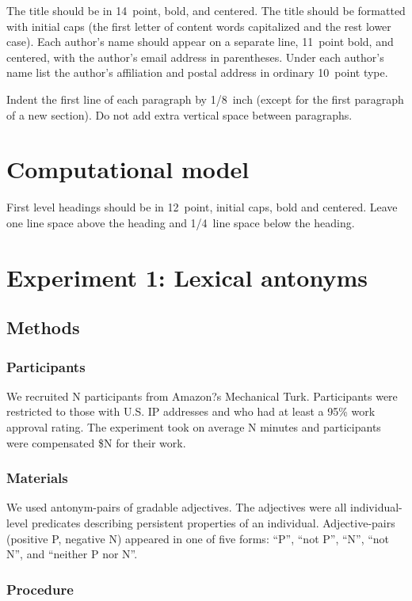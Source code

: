 \documentclass[10pt,letterpaper]{article}
\begin{document}
The title should be in 14~point, bold, and centered. The title should
be formatted with initial caps (the first letter of content words
capitalized and the rest lower case). Each author's name should appear
on a separate line, 11~point bold, and centered, with the author's
email address in parentheses. Under each author's name list the
author's affiliation and postal address in ordinary 10~point type.

Indent the first line of each paragraph by 1/8~inch (except for the
first paragraph of a new section). Do not add extra vertical space
between paragraphs.


\section{Computational model}

First level headings should be in 12~point, initial caps, bold and
centered. Leave one line space above the heading and 1/4~line space
below the heading.

\section{Experiment 1: Lexical antonyms}
\subsection{Methods}
\subsubsection{Participants}

We recruited N participants from Amazon?s Mechanical Turk. Participants were restricted to those with U.S. IP addresses and who had at least a 95\% work approval rating. The experiment took on average N minutes and participants were compensated \$N for their work.

\subsubsection{Materials}

We used antonym-pairs of gradable adjectives.
The adjectives were all individual-level predicates describing persistent properties of an individual. 
Adjective-pairs (positive P, negative N) appeared in one of five forms: ``P'', ``not P'', ``N'', ``not N'', and ``neither P nor N''. 

\subsubsection{Procedure}
\end{document}
